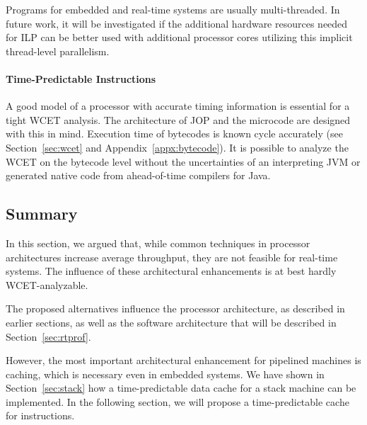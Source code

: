 Programs for embedded and real-time systems are usually
multi-threaded. In future work, it will be investigated if the
additional hardware resources needed for ILP can be better used with
additional processor cores utilizing this implicit thread-level
parallelism.

\paragraph{Time-Predictable Instructions}

A good model of a processor with accurate timing information is
essential for a tight WCET analysis. The architecture of JOP and the
microcode are designed with this in mind. Execution time of
bytecodes is known cycle accurately (see Section~\ref{sec:wcet} and
Appendix~\ref{appx:bytecode}). It is possible to analyze the WCET on
the bytecode level \cite{R:Bernat:2000a} without the uncertainties
of an interpreting JVM \cite{R:Bate:2000a} or generated native code
from ahead-of-time compilers for Java.

\subsection{Summary}

In this section, we argued that, while common techniques in
processor architectures increase average throughput, they are not
feasible for real-time systems. The influence of these architectural
enhancements is at best hardly WCET-analyzable.

The proposed alternatives influence the processor architecture, as
described in earlier sections, as well as the software architecture
that will be described in Section~\ref{sec:rtprof}.

However, the most important architectural enhancement for pipelined
machines is caching, which is necessary even in embedded systems. We
have shown in Section~\ref{sec:stack} how a time-predictable data
cache for a stack machine can be implemented. In the following
section, we will propose a time-predictable cache for instructions.
